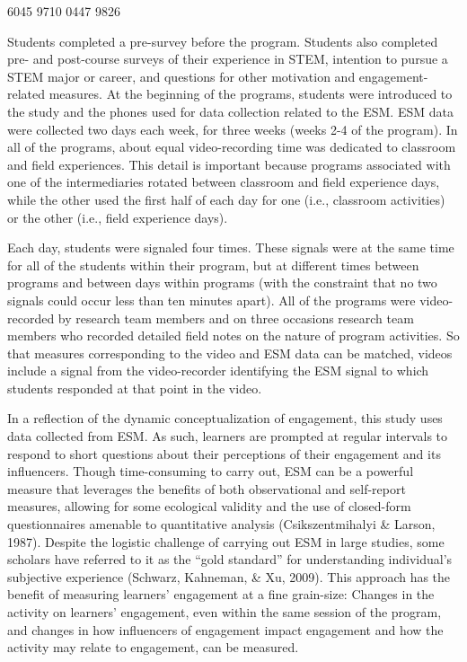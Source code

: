 \documentclass[]{msu-thesis}
\theoremstyle{definition}
\theoremstyle{definition}
\theoremstyle{definition}
\theoremstyle{remark}
\begin{document}
6045 9710 0447 9826

Students completed a pre-survey before the program. Students also
completed pre- and post-course surveys of their experience in STEM,
intention to pursue a STEM major or career, and questions for other
motivation and engagement-related measures. At the beginning of the
programs, students were introduced to the study and the phones used for
data collection related to the ESM. ESM data were collected two days
each week, for three weeks (weeks 2-4 of the program). In all of the
programs, about equal video-recording time was dedicated to classroom
and field experiences. This detail is important because programs
associated with one of the intermediaries rotated between classroom and
field experience days, while the other used the first half of each day
for one (i.e., classroom activities) or the other (i.e., field
experience days).

Each day, students were signaled four times. These signals were at the
same time for all of the students within their program, but at different
times between programs and between days within programs (with the
constraint that no two signals could occur less than ten minutes apart).
All of the programs were video-recorded by research team members and on
three occasions research team members who recorded detailed field notes
on the nature of program activities. So that measures corresponding to
the video and ESM data can be matched, videos include a signal from the
video-recorder identifying the ESM signal to which students responded at
that point in the video.

In a reflection of the dynamic conceptualization of engagement, this
study uses data collected from ESM. As such, learners are prompted at
regular intervals to respond to short questions about their perceptions
of their engagement and its influencers. Though time-consuming to carry
out, ESM can be a powerful measure that leverages the benefits of both
observational and self-report measures, allowing for some ecological
validity and the use of closed-form questionnaires amenable to
quantitative analysis (Csikszentmihalyi \& Larson, 1987). Despite the
logistic challenge of carrying out ESM in large studies, some scholars
have referred to it as the ``gold standard'' for understanding
individual's subjective experience (Schwarz, Kahneman, \& Xu, 2009).
This approach has the benefit of measuring learners' engagement at a
fine grain-size: Changes in the activity on learners' engagement, even
within the same session of the program, and changes in how influencers
of engagement impact engagement and how the activity may relate to
engagement, can be measured.
\end{document}
